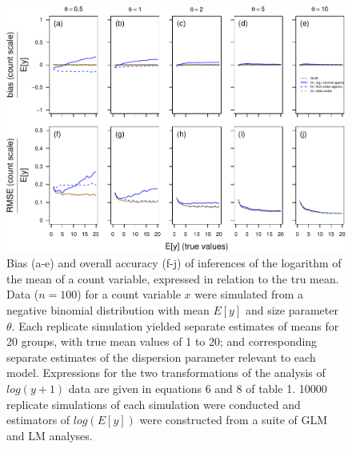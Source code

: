 \documentclass[]{article}
\begin{document}
\begin{figure}[h]

{\centering \includegraphics{revisiting_count_data_advice_files/figure-latex/SupplementRelativeScaleSeparateModels-1} 

}

\caption{Bias (a-e) and overall accuracy (f-j) of inferences of the logarithm of the mean of a count variable, expressed in relation to the tru mean.  Data ($n=100$) for a count variable $x$ were simulated from a negative binomial distribution with mean $E[y]$ and size parameter $\theta$.   Each replicate simulation yielded separate estimates of means for 20 groups, with true mean values of 1 to 20; and corresponding separate estimates of the dispersion parameter relevant to each model.  Expressions for the two transformations of the analysis of $log(y+1)$ data are given in equations 6 and 8 of table 1. 10000 replicate simulations of each simulation were conducted and estimators of $log(E[y])$ were constructed from a suite of GLM and LM analyses.}\label{fig:SupplementRelativeScaleSeparateModels}
\end{figure}
\end{document}

